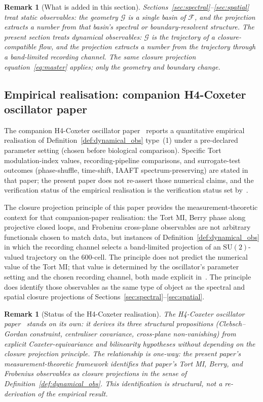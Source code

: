 \documentclass[12pt]{article}
\newtheorem{remark}[theorem]{Remark}
\newcommand{\Fcal}{\mathcal{F}}
\newcommand{\Gcal}{\mathcal{G}}
\begin{document}
\begin{remark}[What is added in this section]
Sections~\ref{sec:spectral}--\ref{sec:spatial} treat static observables: the geometry $\Gcal$ is a single basin of $\Fcal$, and the projection extracts a number from that basin's spectral or boundary-resolvent structure. The present section treats dynamical observables: $\Gcal$ is the trajectory of a closure-compatible flow, and the projection extracts a number from the trajectory through a band-limited recording channel. The same closure projection equation~\eqref{eq:master} applies; only the geometry and boundary change.
\end{remark}

\subsection{Empirical realisation: companion H4-Coxeter oscillator paper}\label{subsec:h4_coxeter}

The companion H4-Coxeter oscillator paper~\citep{H4Coxeter2026} reports a quantitative empirical realisation of Definition~\ref{def:dynamical_obs} type~(1) under a pre-declared parameter setting (chosen before biological comparison). Specific Tort modulation-index values, recording-pipeline comparisons, and surrogate-test outcomes (phase-shuffle, time-shift, IAAFT spectrum-preserving) are stated in that paper; the present paper does not re-assert those numerical claims, and the verification status of the empirical realisation is the verification status set by~\citep{H4Coxeter2026}.

The closure projection principle of this paper provides the measurement-theoretic context for that companion-paper realisation: the Tort MI, Berry phase along projective closed loops, and Frobenius cross-plane observables are not arbitrary functionals chosen to match data, but instances of Definition~\ref{def:dynamical_obs} in which the recording channel selects a band-limited projection of an $\mathrm{SU}(2)$-valued trajectory on the 600-cell. The principle does not predict the numerical value of the Tort MI; that value is determined by the oscillator's parameter setting and the chosen recording channel, both made explicit in~\citep{H4Coxeter2026}. The principle does identify those observables as the same type of object as the spectral and spatial closure projections of Sections~\ref{sec:spectral}--\ref{sec:spatial}.

\begin{remark}[Status of the H4-Coxeter realisation]
The H4-Coxeter oscillator paper~\citep{H4Coxeter2026} stands on its own: it derives its three structural propositions (Clebsch--Gordan constraint, centraliser covariance, cross-plane non-vanishing) from explicit Coxeter-equivariance and bilinearity hypotheses without depending on the closure projection principle. The relationship is one-way: the present paper's measurement-theoretic framework identifies that paper's Tort MI, Berry, and Frobenius observables as closure projections in the sense of Definition~\ref{def:dynamical_obs}. This identification is structural, not a re-derivation of the empirical result.
\end{remark}
\end{document}

